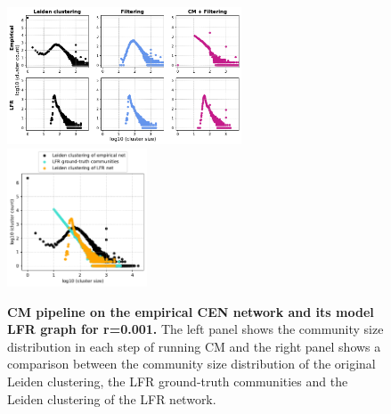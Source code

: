 \documentclass[a4paper]{article}   	%
\begin{document}
\begin{figure}[h!]
\centering
\includegraphics[width=0.62\textwidth]{figs/cen_cm_steps_lfr001.pdf}
\includegraphics[width=0.37\textwidth]{figs/cen_001_cm_size.pdf}
\caption[CM pipeline on the empirical CEN network and its model LFR graph for r=0.001]{\textbf{CM pipeline on the empirical CEN network and its model LFR graph for r=0.001.} The left panel shows the community size distribution in each step of running CM and the right panel shows a comparison between the community size distribution of the original Leiden clustering, the LFR ground-truth communities and the Leiden clustering of the LFR network.}
\label{fig:cen-cm-lfr-001}
\end{figure}
\end{document}
